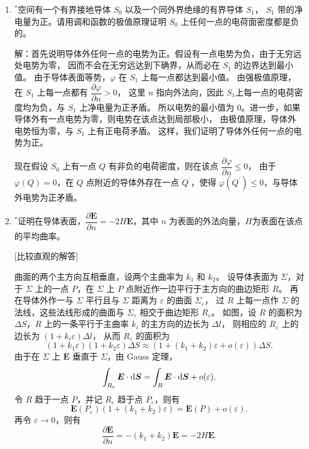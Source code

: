 \begin{enumerate}
\item ${ }^*$空间有一个有界接地导体 $S_0$ 以及一个同外界绝缘的有界导体 $S_1$，
$S_1$ 带的净电量为正。请用调和函数的极值原理证明 $S_0$ 上任何一点的电荷面密度都是负的。

解：首先说明导体外任何一点的电势为正。假设有一点电势为负，由于无穷远处电势为零，
因而不会在无穷远达到下确界，从而必在 $S_{1}$ 的边界达到最小值。
由于导体表面等势，$\varphi$ 在 $S_{1}$ 上每一点都达到最小值。
由强极值原理，在 $S_{1}$ 上每一点都有 $\dfrac{\partial \varphi}{\partial n}>0$，
这里 $n$ 指向外法向，因此 $S_{1}$上每一点的电荷密度均为负，与 $S_{1}$ 上净电量为正矛盾。
所以电势的最小值为 $0$。进一步，如果导体外有一点电势为零，则电势在该点达到局部极小，
由极值原理，导体外电势恒为零，与 $S_{1}$ 上有正电荷矛盾。
这样，我们证明了导体外任何一点的电势为正。

现在假设 $S_{0}$ 上有一点 $Q$ 有非负的电荷密度，则在该点 $\dfrac{\partial \varphi}{\partial n} \leqslant 0$，
由于 $\varphi(Q)=0$，在 $Q$ 点附近的导体外存在一点 $Q^{\prime}$，使得 $\varphi(Q^{\prime}) \leqslant 0$，与导体外电势为正矛盾。

\item ${ }^*$证明在导体表面，$\dfrac{\partial \boldsymbol{E}}{\partial n}=-2H\boldsymbol{E}$，其中 $n$ 为表面的外法向量，$H$为表面在该点的平均曲率。

[比较直观的解答]
曲面的两个主方向互相垂直，设两个主曲率为 $k_{1}$ 和 $k_{2}$。
设导体表面为 $\Sigma$，对于 $\Sigma$ 上的一点 $P$，在 $\Sigma$ 上 $P$ 点附近作一边平行于主方向的曲边矩形 $R$。
再在导体外作一与 $\Sigma$ 平行且与 $\Sigma$ 距离为 $\varepsilon$ 的曲面 $\Sigma_{\varepsilon}$，
过 $R$ 上每一点作 $\Sigma$ 的法线，这些法线形成的曲面与 $\Sigma_{\varepsilon}$ 相交于曲边矩形 $R_{\varepsilon}$。
如图，设 $R$ 的面积为 $\Delta S$，$R$ 上的一条平行于主曲率 $k_{i}$ 的主方向的边长为 $\Delta l$，
则相应的 $R_{\varepsilon}$ 上的边长为 $(1+k_{i} \varepsilon) \Delta l$，
从而 $R_{\varepsilon}$ 的面积为
$$(1+k_{1} \varepsilon)(1+k_{2} \varepsilon) \Delta S 
\approx(1+(k_{1}+k_{2}) \varepsilon+o(\varepsilon)) \Delta S.$$
由于在 $\Sigma$ 上 $\boldsymbol{E}$ 垂直于 $\Sigma$，由 Gauss 定理，
$$\int_{R_{\varepsilon}} \boldsymbol{E} \cdot {\rm d} \boldsymbol{S}
=\int_{R} \boldsymbol{E} \cdot {\rm d} \boldsymbol{S}+o(\varepsilon).$$
令 $R$ 趋于一点 $P$，并记 $R_{\varepsilon}$ 趋于点 $P_{\varepsilon}$，则有
$$\boldsymbol{E}(P_{\varepsilon})(1+(k_{1}+k_{2}) \varepsilon)
=\boldsymbol{E}(P)+o(\varepsilon).$$
再令 $\varepsilon \rightarrow 0$，则有
$$\frac{\partial \boldsymbol{E}}{\partial n}
=-(k_{1}+k_{2}) \boldsymbol{E}=-2H\boldsymbol{E}.$$


\end{enumerate}

